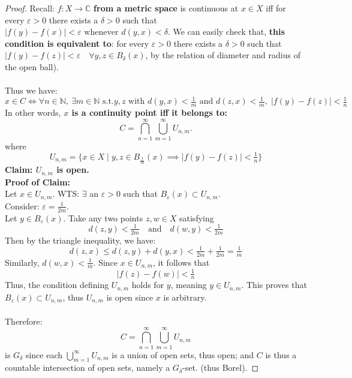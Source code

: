 \documentclass[lang=cn,11pt]{elegantbook}
\begin{document}
\begin{proof}
Recall: \(f\colon X\to\mathbb{C}\) \textbf{from a metric space} is continuous at \(x\in X\) iff for every \(\varepsilon > 0\) there exists a \(\delta > 0\) such that\( |f(y)-f(x)| < \varepsilon \text{ whenever } d(y,x) < \delta \).
We can easily check that, \textbf{this condition is equivalent to}: for every \(\varepsilon > 0\) there exists a \(\delta > 0\) such that \(|f(y)-f(z)| < \varepsilon \quad \forall y,z \in B_\delta(x)\), by the relation of diameter and radius of the open ball).\\\\
Thus we have: 
\[
x \in C \Longleftrightarrow \forall n\in\mathbb{N},\ \exists m\in\mathbb{N} \text{ s.t.} y,z \text{ with } d(y,x) < \tfrac{1}{m} \text{ and } d(z,x) < \tfrac{1}{m},\; |f(y)-f(z)| < \tfrac{1}{n}
\]
In other words, \textbf{\(x\) is a continuity point iff it belongs to:}
\[
C = \bigcap_{n=1}^\infty \bigcup_{m=1}^\infty U_{n,m}.
\] where \[
U_{n,m} = \Big\{x\in X \mid  y,z\in B_\frac{1}{m} (x)\implies |f(y)-f(z)| < \tfrac{1}{n}\Big\}
\]
\textbf{Claim: \(U_{n,m}\) is open.}\\
\textbf{Proof of Claim:}\\
Let \(x\in U_{n,m}\). WTS: $\exists$ an \(\varepsilon > 0\) such that \(B_\varepsilon(x) \subset U_{n,m}\).\\
Consider: \(\varepsilon = \tfrac{1}{2m}\). \\
Let \(y \in B_\varepsilon(x)\). Take any two points \(z,w \in X\) satisfying
\[
d(z,y) < \tfrac{1}{2m} \quad \text{and} \quad d(w,y) < \tfrac{1}{2m}
\]
Then by the triangle inequality, we have:
\[
d(z,x) \le d(z,y) + d(y,x) < \tfrac{1}{2m} + \tfrac{1}{2m} = \tfrac{1}{m}
\]
Similarly, \(d(w,x) < \tfrac{1}{m}\).  Since \(x \in U_{n,m}\), it follows that
\[
|f(z) - f(w)| < \tfrac{1}{n}
\]
Thus, the condition defining \(U_{n,m}\) holds for \(y\), meaning \(y \in U_{n,m}\).  This proves that \(B_\varepsilon(x) \subset U_{n,m}\), thus $U_{n,m}$ is open since $x$ is arbitrary.\\\\
Therefore:
\[
C = \bigcap_{n=1}^\infty \bigcup_{m=1}^\infty U_{n,m}
\] is $G_\delta$ since each $ \bigcup_{m=1}^\infty U_{n,m}$ is a union of open sets, thus open; and $C$ is thus a countable intersection of open sets, namely a \(G_\delta\)-set. (thus Borel).

\end{proof}
\begin{comment}
\begin{remark}
  对于任意一个 metric space, 它的所有连续点构成的集合都是 countable 个 open sets 的交集.  
\end{remark}
\end{comment}   
    
\end{document}
